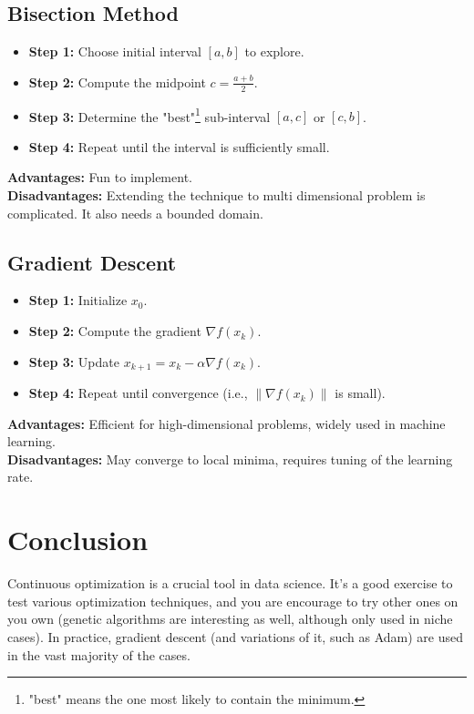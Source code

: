 \documentclass[]{article}
\begin{document}
	\subsection*{Bisection Method}
	\begin{itemize}
		\item \textbf{Step 1:} Choose initial interval $[a, b]$ to explore.
		\item \textbf{Step 2:} Compute the midpoint $c = \frac{a+b}{2}$.
		\item \textbf{Step 3:} Determine the "best"\footnote{"best" means the one most likely to contain the minimum.} sub-interval $[a, c]$ or $[c, b]$.
		\item \textbf{Step 4:} Repeat until the interval is sufficiently small.
	\end{itemize}
	\textbf{Advantages:} Fun to implement.
	\\
	\textbf{Disadvantages:} Extending the technique to multi dimensional problem is complicated.
	It also needs a bounded domain.
	
	\subsection*{Gradient Descent}
	\begin{itemize}
		\item \textbf{Step 1:} Initialize $x_0$.
		\item \textbf{Step 2:} Compute the gradient $\nabla f(x_k)$.
		\item \textbf{Step 3:} Update $x_{k+1} = x_k - \alpha \nabla f(x_k)$.
		\item \textbf{Step 4:} Repeat until convergence (i.e., $\|\nabla f(x_k)\|$ is small).
	\end{itemize}
	\textbf{Advantages:} Efficient for high-dimensional problems, widely used in machine learning.
	\\
	\textbf{Disadvantages:} May converge to local minima, requires tuning of the learning rate.
	
	\section*{Conclusion}
	Continuous optimization is a crucial tool in data science.
	It's a good exercise to test various optimization techniques, and you are encourage to try other ones on you own (genetic algorithms are interesting as well, although only used in niche cases).
	In practice, gradient descent (and variations of it, such as Adam) are used in the vast majority of the cases.
	
	
\end{document}
